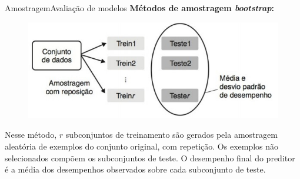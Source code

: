 \documentclass[t]{beamer}
\begin{document}
\begin{ftst}{Amostragem}{Avaliação de modelos}
\justifying
\textbf{Métodos de amostragem \textit{bootstrap}:}
\vone
\begin{figure}
    \centering
    \includegraphics[scale=0.5]{Figuras/slide04_05.jpg}
\end{figure}
\small
Nesse método, $r$ subconjuntos de treinamento são gerados pela amostragem aleatória de exemplos do conjunto original, com repetição. Os exemplos não selecionados compõem os subconjuntos de teste.
\vone
O desempenho final do preditor é a média dos desempenhos observados sobre cada subconjunto de teste.

\end{ftst}

\end{document}
